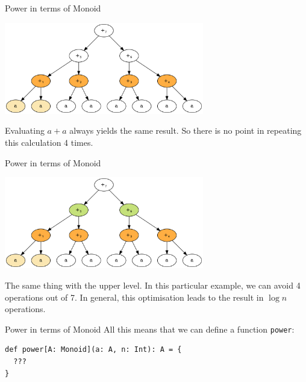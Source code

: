 \documentclass[presentation,aspectratio=169,smaller]{beamer}
\begin{document}
\begin{frame}[label={sec:org437d800}]{Power in terms of Monoid}
\begin{center}
\includegraphics[height=4cm]{.dot/fold-power-2.png}
\end{center}

Evaluating \(a + a\) always yields the same result. So there is no point in
repeating this calculation 4 times.
\end{frame}

\begin{frame}[label={sec:org728e415}]{Power in terms of Monoid}
\begin{center}
\includegraphics[height=4cm]{.dot/fold-power-3.png}
\end{center}

The same thing with the upper level. In this particular example, we can avoid 4
operations out of 7. In general, this optimisation leads to the result in \(\log
n\) operations.
\end{frame}

\begin{frame}[label={sec:org2b0cf96},fragile]{Power in terms of Monoid}
 All this means that we can define a function \texttt{power}:

\begin{verbatim}
def power[A: Monoid](a: A, n: Int): A = {
  ???
}
\end{verbatim}
\end{frame}
\end{document}
